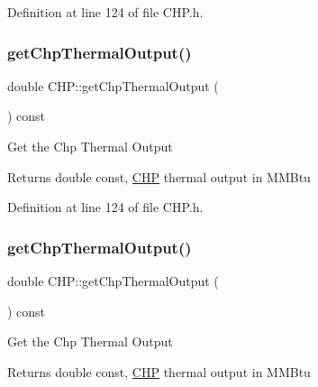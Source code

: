 Definition at line 124 of file C\+H\+P.\+h.

\mbox{\label{class_c_h_p_a13e271f59d6315088416123c6e794e09}} 
\subsubsection{\texorpdfstring{get\+Chp\+Thermal\+Output()}{getChpThermalOutput()}\hspace{0.1cm}{\footnotesize\ttfamily [2/3]}}
{\footnotesize\ttfamily double C\+H\+P\+::get\+Chp\+Thermal\+Output (\begin{DoxyParamCaption}{ }\end{DoxyParamCaption}) const\hspace{0.3cm}{\ttfamily [inline]}}

Get the Chp Thermal Output

\begin{DoxyReturn}{Returns}
double const, \hyperlink{class_c_h_p}{C\+HP} thermal output in M\+M\+Btu 
\end{DoxyReturn}


Definition at line 124 of file C\+H\+P.\+h.

\mbox{\label{class_c_h_p_a13e271f59d6315088416123c6e794e09}} 
\subsubsection{\texorpdfstring{get\+Chp\+Thermal\+Output()}{getChpThermalOutput()}\hspace{0.1cm}{\footnotesize\ttfamily [3/3]}}
{\footnotesize\ttfamily double C\+H\+P\+::get\+Chp\+Thermal\+Output (\begin{DoxyParamCaption}{ }\end{DoxyParamCaption}) const\hspace{0.3cm}{\ttfamily [inline]}}

Get the Chp Thermal Output

\begin{DoxyReturn}{Returns}
double const, \hyperlink{class_c_h_p}{C\+HP} thermal output in M\+M\+Btu 
\end{DoxyReturn}


